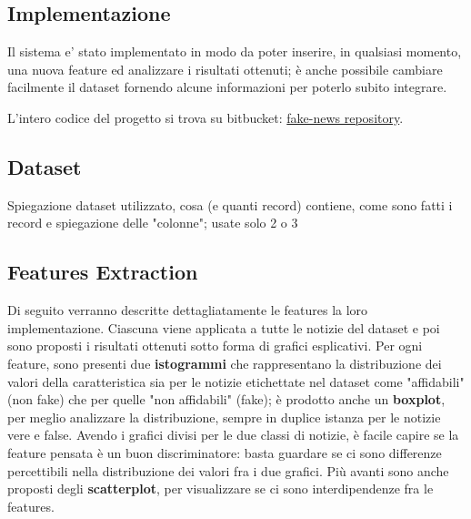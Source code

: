 \documentclass{article}
\begin{document}
\begin{multicols}{2}
			
	    
		    
	    \section{Implementazione}
		    Il sistema e' stato implementato in modo da poter inserire, in qualsiasi momento, una nuova feature ed analizzare i risultati ottenuti; è anche possibile cambiare facilmente il dataset fornendo alcune informazioni per poterlo subito integrare.
		    
		    L'intero codice del progetto si trova su bitbucket: 
		    \href{https://bitbucket.org/IcedGarion/fake-news}{fake-news repository}. 
		    
			\subsection{Dataset}
			Spiegazione dataset utilizzato, cosa (e quanti record) contiene, come sono fatti i record e spiegazione delle "colonne"; usate solo 2 o 3
			
			\subsection{Features Extraction}
			Di seguito verranno descritte dettagliatamente le features la loro implementazione.
			Ciascuna viene applicata a tutte le notizie del dataset e poi sono proposti i risultati ottenuti sotto forma di grafici esplicativi. Per ogni feature, sono presenti due \textbf{istogrammi} che rappresentano la distribuzione dei valori della caratteristica sia per le notizie etichettate nel dataset come "affidabili" (non fake) che per quelle "non affidabili" (fake); è prodotto anche un \textbf{boxplot}, per meglio analizzare la distribuzione, sempre in duplice istanza per le notizie vere e false. 
			Avendo i grafici divisi per le due classi di notizie, è facile capire se la feature pensata è un buon discriminatore: basta guardare se ci sono differenze percettibili nella distribuzione dei valori fra i due grafici.
			Più avanti sono anche proposti degli \textbf{scatterplot}, per visualizzare se ci sono interdipendenze fra le features.
			

\end{multicols}
\end{document}

